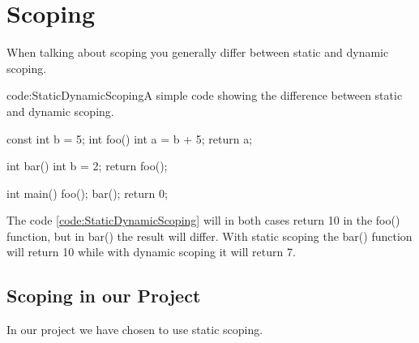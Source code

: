 \section{Scoping}
When talking about scoping you generally differ between static and dynamic scoping. 

\begin{code}{code:StaticDynamicScoping}{A simple code showing the difference between static and dynamic scoping.}
\begin{listing}
const int b = 5;
int foo()
{
	int a = b + 5;
	return a;
}

int bar()
{
	int b = 2;
	return foo();
}

int main()
{
	foo();
	bar();
	return 0;
}
\end{listing}
\end{code}

The code \ref{code:StaticDynamicScoping} will in both cases return 10 in the foo() function, but in bar() the result will differ. With static scoping the bar() function will return 10 while with dynamic scoping it will return 7. 








\subsection{Scoping in our Project}
In our project we have chosen to use static scoping. 

